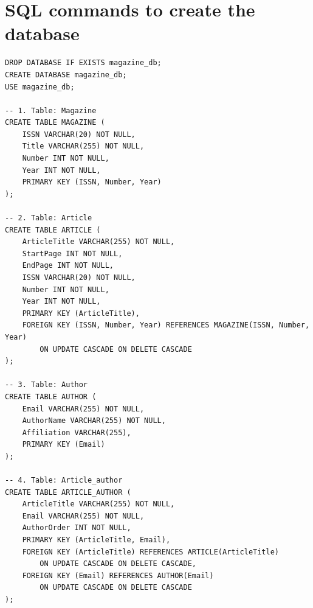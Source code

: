 \documentclass[11pt,a4paper]{article}
\begin{document}
\newpage
\section{SQL commands to create the database}
\begin{Verbatim}
DROP DATABASE IF EXISTS magazine_db;
CREATE DATABASE magazine_db;
USE magazine_db;

-- 1. Table: Magazine
CREATE TABLE MAGAZINE (
    ISSN VARCHAR(20) NOT NULL,
    Title VARCHAR(255) NOT NULL,
    Number INT NOT NULL,
    Year INT NOT NULL,
    PRIMARY KEY (ISSN, Number, Year)
);

-- 2. Table: Article
CREATE TABLE ARTICLE (
    ArticleTitle VARCHAR(255) NOT NULL,
    StartPage INT NOT NULL,
    EndPage INT NOT NULL,
    ISSN VARCHAR(20) NOT NULL,
    Number INT NOT NULL,
    Year INT NOT NULL,
    PRIMARY KEY (ArticleTitle),
    FOREIGN KEY (ISSN, Number, Year) REFERENCES MAGAZINE(ISSN, Number, Year)
        ON UPDATE CASCADE ON DELETE CASCADE
);

-- 3. Table: Author
CREATE TABLE AUTHOR (
    Email VARCHAR(255) NOT NULL,
    AuthorName VARCHAR(255) NOT NULL,
    Affiliation VARCHAR(255),
    PRIMARY KEY (Email)
);

-- 4. Table: Article_author
CREATE TABLE ARTICLE_AUTHOR (
    ArticleTitle VARCHAR(255) NOT NULL,
    Email VARCHAR(255) NOT NULL,
    AuthorOrder INT NOT NULL,
    PRIMARY KEY (ArticleTitle, Email),
    FOREIGN KEY (ArticleTitle) REFERENCES ARTICLE(ArticleTitle)
        ON UPDATE CASCADE ON DELETE CASCADE,
    FOREIGN KEY (Email) REFERENCES AUTHOR(Email)
        ON UPDATE CASCADE ON DELETE CASCADE
);
\end{Verbatim}

\newpage
\end{document}
